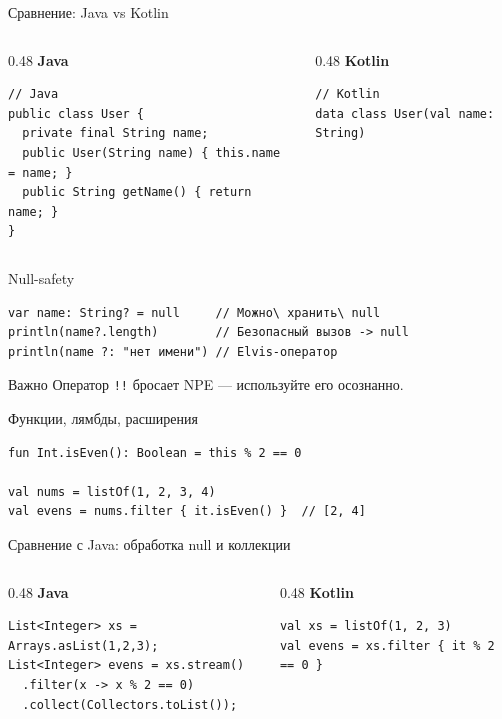 \documentclass[aspectratio=169]{beamer}
\begin{document}
\begin{frame}[fragile]{Сравнение: Java vs Kotlin}
\begin{columns}[T,onlytextwidth]
\begin{column}{0.48\textwidth}
\textbf{Java}
\lstset{language=JavaLite}
\begin{lstlisting}
// Java
public class User {
  private final String name;
  public User(String name) { this.name = name; }
  public String getName() { return name; }
}
\end{lstlisting}
\end{column}
\begin{column}{0.48\textwidth}
\textbf{Kotlin}
\lstset{language=Kotlin}
\begin{lstlisting}
// Kotlin
data class User(val name: String)
\end{lstlisting}
\end{column}
\end{columns}
\end{frame}

\begin{frame}[fragile]{Null-safety}
\lstset{language=Kotlin}
\begin{lstlisting}
var name: String? = null     // Можно\ хранить\ null
println(name?.length)        // Безопасный вызов -> null
println(name ?: "нет имени") // Elvis-оператор
\end{lstlisting}
\begin{block}{Важно}
Оператор \texttt{!!} бросает NPE — используйте его осознанно.
\end{block}
\end{frame}

\begin{frame}[fragile]{Функции, лямбды, расширения}
\lstset{language=Kotlin}
\begin{lstlisting}
fun Int.isEven(): Boolean = this % 2 == 0

val nums = listOf(1, 2, 3, 4)
val evens = nums.filter { it.isEven() }  // [2, 4]
\end{lstlisting}
\end{frame}

\begin{frame}[fragile]{Сравнение с Java: обработка null и коллекции}
\begin{columns}[T,onlytextwidth]
\begin{column}{0.48\textwidth}
\textbf{Java}
\lstset{language=JavaLite}
\begin{lstlisting}
List<Integer> xs = Arrays.asList(1,2,3);
List<Integer> evens = xs.stream()
  .filter(x -> x % 2 == 0)
  .collect(Collectors.toList());
\end{lstlisting}
\end{column}
\begin{column}{0.48\textwidth}
\textbf{Kotlin}
\lstset{language=Kotlin}
\begin{lstlisting}
val xs = listOf(1, 2, 3)
val evens = xs.filter { it % 2 == 0 }
\end{lstlisting}
\end{column}
\end{columns}
\end{frame}
\end{document}

